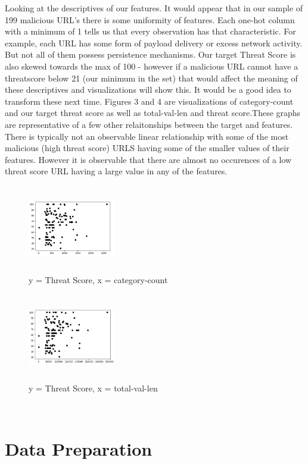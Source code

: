 \documentclass[conference]{IEEEtran}
\begin{document}
Looking at the descriptives of our features. It would appear that in our sample of 199 malicious URL's there is some uniformity of features. Each one-hot column with a minimum of 1 tells us that every observation has that characteristic. For example, each URL has some form of payload delivery or excess network activity. But not all of them possess persistence mechanisms. Our target Threat Score is also skewed towards the max of 100 - however if a malicious URL cannot have a threatscore below 21 (our minimum in the set) that would affect the meaning of these descriptives and visualizations will show this. It would be a good idea to transform these next time. Figures 3 and 4 are visualizations of category-count and our target threat score as well as total-val-len and threat score.These graphs are representative of a few other relaitonships between the target and features. There is typically not an observable linear relationship with some of the most malicious (high threat score) URLS having some of the smaller values of their features. However it is observable that there are almost no occurences of a low threat score URL having a large value in any of the features.
\begin{figure}[h]
\centerline{\includegraphics[width=1.5in, height=1.5in]{ts-vs-category.PNG}}
\caption{y = Threat Score, x = category-count}
\label{fig}
\end{figure}
\begin{figure}[h]
\centerline{\includegraphics[width=1.5in, height=1.5in]{ts-vs-toalval.PNG}}
\caption{y = Threat Score, x = total-val-len}
\label{fig}
\end{figure}\\

\section{Data Preparation}
\end{document}
